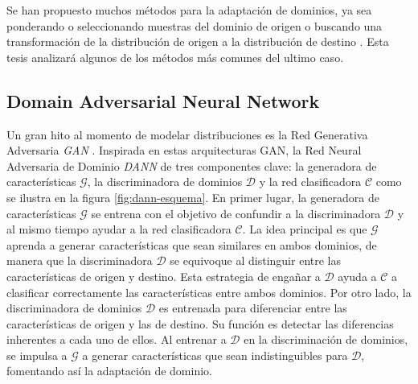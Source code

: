 Se han propuesto muchos métodos para la adaptación de dominios, ya sea ponderando o seleccionando muestras del dominio
de origen \parencite{sugiyama2007direct} o buscando una transformación de la distribución de origen a la distribución de destino \parencite{gong2013connecting}. Esta tesis analizará algunos de los métodos más comunes del ultimo caso.

\subsection{Domain Adversarial Neural Network}
Un gran hito al momento de modelar distribuciones es la Red Generativa Adversaria {\it GAN} \parencite{goodfellow2020generative}. Inspirada en estas arquitecturas GAN, la Red Neural Adversaria de Dominio {\it DANN} \parencite{ganin2016domain} de tres componentes clave: la generadora de características $\mathcal{G}$, la discriminadora de
dominios $\mathcal{D}$ y la red clasificadora $\mathcal{C}$ como se ilustra en la figura \ref{fig:dann-esquema}. En
primer lugar, la generadora de características $\mathcal{G}$ se entrena con el objetivo de confundir a la
discriminadora $\mathcal{D}$ y al mismo tiempo ayudar a la red clasificadora $\mathcal{C}$. La idea principal es que
$\mathcal{G}$ aprenda a generar características que sean similares en ambos dominios, de manera que la discriminadora
$\mathcal{D}$ se equivoque al distinguir entre las características de origen y destino. Esta estrategia de engañar a
$\mathcal{D}$ ayuda a $\mathcal{C}$ a clasificar correctamente las características entre ambos dominios. Por otro lado,
la discriminadora de dominios $\mathcal{D}$ es entrenada para diferenciar entre las características de origen y las de
destino. Su función es detectar las diferencias inherentes a cada uno de ellos. Al entrenar a $\mathcal{D}$ en la
discriminación de dominios, se impulsa a $\mathcal{G}$ a generar características que sean indistinguibles para
$\mathcal{D}$, fomentando así la adaptación de dominio.

